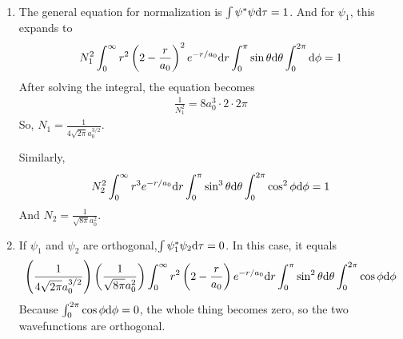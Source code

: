 \begin{solution}\
    \begin{enumerate}
        \item The general equation for normalization is $\int\psi^*\psi\mathrm{d}\tau=1$. And for $\psi_1$, this expands to
              \begin{align*}
                  N_{1}^{2}\int_{0}^{\infty}r^{2}\left(2-\frac{r}{a_{0}}\right)^{2}e^{-r/a_{0}}\mathrm{d} r\int_{0}^{\pi}\sin\theta\mathrm{d}
                  \theta\int_{0}^{2\pi}\mathrm{d}\phi=1
              \end{align*}
              After solving the integral, the equation becomes
              \begin{align*}
                  \frac{1}{N_1^2}=8 a_{0}^{3}\cdot 2\cdot 2 \pi
              \end{align*}
              So, $N_1=\frac{1}{4 \sqrt{2 \pi} a_{0}^{3 / 2}}$.

              Similarly,
              \begin{align*}
                  N_{2}^{2}\int_{0}^{\infty}r^{3}e^{-r/a_{0}}\mathrm{d} r\int_{0}^{\pi}\sin^{3}\theta\mathrm{d}\theta\int_{0}^{2\pi}
                  \cos^{2}\phi\mathrm{d}\phi=1
              \end{align*}
              And $N_2=\frac{1}{\sqrt{8\pi} a_{0}^{2}}$.
        \item If $\psi_1$ and $\psi_2$ are orthogonal,$\int\psi_1^*\psi_2\mathrm{d}\tau=0$. In this case, it equals
              \begin{align*}
                  \left(\frac{1}{4\sqrt{2\pi}a_{0}^{3/2}}\right)\left(\frac{1}{\sqrt{8\pi}a_{0}^{2}}\right)\int_{0}^{\infty}
                  r^{2}\left(2-\frac{r}{a_{0}}\right)e^{-r/a_{0}}\mathrm{d} r\int_{0}^{\pi}\sin^{2}\theta\mathrm{d}\theta\int_{0}^{2\pi}\cos\phi\mathrm{d}\phi
              \end{align*}
              Because $\int_{0}^{2\pi}\cos\phi\mathrm{d}\phi=0$, the whole thing becomes zero, so the two wavefunctions are orthogonal.
    \end{enumerate}
\end{solution}

